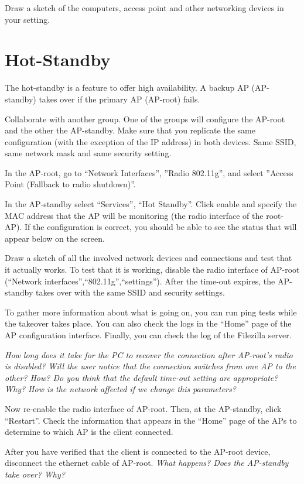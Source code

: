 Draw a sketch of the computers, access point and other networking devices in your setting.

\section{Hot-Standby}

The hot-standby is a feature to offer high availability.
A backup AP (AP-standby) takes over if the primary AP (AP-root) fails.

Collaborate with another group.
One of the groups will configure the AP-root and the other the AP-standby.
Make sure that you replicate the same configuration (with the exception of the IP address) in both devices.
Same SSID, same network mask and same security setting.

In the AP-root, go to ``Network Interfaces'', ''Radio 802.11g'', and select ''Access Point (Fallback to radio shutdown)''.

In the AP-standby select ``Services'', ``Hot Standby''.
Click enable and specify the MAC address that the AP will be monitoring (the radio interface of the root-AP).
If the configuration is correct, you should be able to see the status that will appear below on the screen.

Draw a sketch of all the involved network devices and connections and test that it actually works.
To test that it is working, disable the radio interface of AP-root (``Network interfaces'',``802.11g'',``settings'').
After the time-out expires, the AP-standby takes over with the same SSID and security settings.

To gather more information about what is going on, you can run ping tests while the takeover takes place.
You can also check the logs in the ``Home'' page of the AP configuration interface.
Finally, you can check the log of the Filezilla server.

\emph{How long does it take for the PC to recover the connection after AP-root's radio is disabled?
Will the user notice that the connection switches from one AP to the other? How?
Do you think that the default time-out setting are appropriate? Why?
How is the network affected if we change this parameters?
}

Now re-enable the radio interface of AP-root.
Then, at the AP-standby, click ``Restart''.
Check the information that appears in the ``Home'' page of the APs to determine to which AP is the client connected.

After you have verified that the client is connected to the AP-root device, disconnect the ethernet cable of AP-root.
\emph{What happens? Does the AP-standby take over? Why?}

